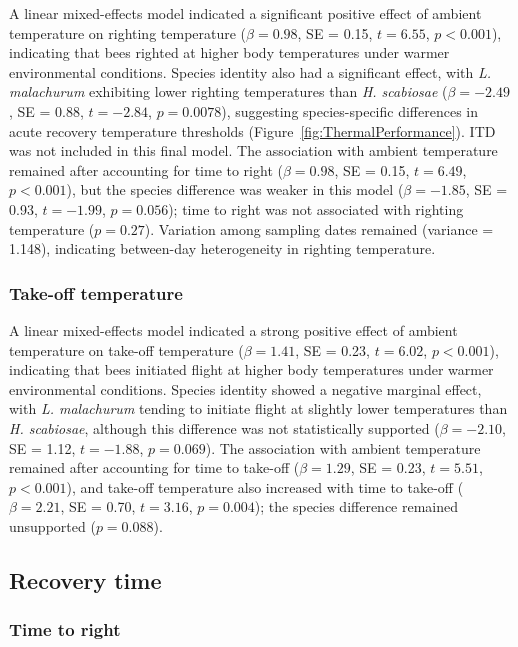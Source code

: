 \documentclass[11pt,a4paper]{article}
\begin{document}
A linear mixed-effects model indicated a significant positive effect of ambient temperature on righting temperature ($\beta = 0.98$, SE = 0.15, $t = 6.55$, $p < 0.001$), indicating that bees righted at higher body temperatures under warmer environmental conditions. Species identity also had a significant effect, with \textit{L. malachurum} exhibiting lower righting temperatures than \textit{H. scabiosae} ($\beta = -2.49$, SE = 0.88, $t = -2.84$, $p = 0.0078$), suggesting species-specific differences in acute recovery temperature thresholds (Figure~\ref{fig:ThermalPerformance}). ITD was not included in this final model. The association with ambient temperature remained after accounting for time to right ($\beta = 0.98$, SE = 0.15, $t = 6.49$, $p < 0.001$), but the species difference was weaker in this model ($\beta = -1.85$, SE = 0.93, $t = -1.99$, $p = 0.056$); time to right was not associated with righting temperature ($p = 0.27$). Variation among sampling dates remained (variance = 1.148), indicating between-day heterogeneity in righting temperature.

\subsubsection{Take-off temperature}

A linear mixed-effects model indicated a strong positive effect of ambient temperature on take-off temperature ($\beta = 1.41$, SE = 0.23, $t = 6.02$, $p < 0.001$), indicating that bees initiated flight at higher body temperatures under warmer environmental conditions. Species identity showed a negative marginal effect, with \textit{L. malachurum} tending to initiate flight at slightly lower temperatures than \textit{H. scabiosae}, although this difference was not statistically supported ($\beta = -2.10$, SE = 1.12, $t = -1.88$, $p = 0.069$). The association with ambient temperature remained after accounting for time to take-off ($\beta = 1.29$, SE = 0.23, $t = 5.51$, $p < 0.001$), and take-off temperature also increased with time to take-off ($\beta = 2.21$, SE = 0.70, $t = 3.16$, $p = 0.004$); the species difference remained unsupported ($p = 0.088$).

\subsection{Recovery time}

\subsubsection{Time to right}
\end{document}
